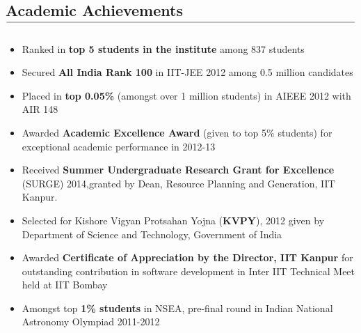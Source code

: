 \documentclass[10pt,letterpaper]{article}
\newcommand\tline[2]{$\underset{\text{#1}}{\text{\underline{\hspace{#2}}}}$}
\begin{document}
\subsection*{Academic Achievements\tline{}{5.2in}}
\vspace{-0.7em}
\begin{itemize}
	\parskip=0.1em

	\item Ranked in \textbf{top 5 students in the institute} among 837 students

	\item Secured \textbf{All India Rank 100} in IIT-JEE 2012 among 0.5 million candidates

	\item Placed in \textbf{top 0.05\%} (amongst over 1 million students) in AIEEE 2012 with AIR 148

	\item Awarded \textbf{Academic Excellence Award} (given to top 5\% students) for exceptional academic performance in
2012-13

	\item Received \textbf{Summer Undergraduate Research Grant for Excellence} (SURGE) 2014,granted by Dean, Resource Planning and Generation, IIT Kanpur.


	\item Selected for Kishore Vigyan Protsahan Yojna (\textbf{KVPY}), 2012 given by Department of Science and Technology,
Government of India

	\item Awarded \textbf{Certificate of Appreciation by the Director, IIT Kanpur} for outstanding contribution in software
development in Inter IIT Technical Meet held at IIT Bombay

	\item Amongst top \textbf{1\% students} in NSEA, pre-final round in Indian National Astronomy Olympiad 2011-2012

	

\end{itemize}




\vspace{-1.8em}
\end{document}
